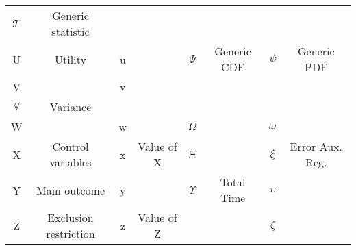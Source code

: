 \begin{center}
\begin{table}
\begin{tabular}{cc cc cc cc}
$\mathcal{T}$			& Generic statistic 						& 				& 								& 			&					& 				&						\\
U			& Utility					& u				&								& $\Psi$	&	Generic CDF				& $\psi$ 		&  Generic PDF						\\
V			& 						& v				& 								& 			&					& 				&						\\
$\mathbb{V}$	& Variance 				&				& 								& 			&					& 				&						\\
W			&		& w				& 								& $\Omega$	&					& $\omega$		&						\\
X			& Control variables 			& x		& Value of X					& $\Xi$		&					& $\xi$			& Error Aux. Reg.	\\
Y			& Main outcome				& y				&								& $\Upsilon$&	Total Time				& $\upsilon$	& 						\\
Z			& Exclusion restriction 		& z				& Value of Z					&			&					& $\zeta$		&						\\  \hline \hline
\end{tabular}
\end{table}
\end{center}

  